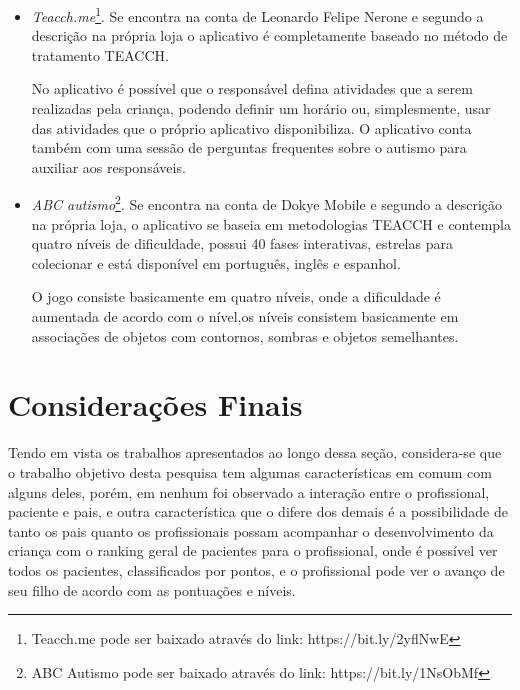 \begin{itemize}
	
	\item \textit{Teacch.me}\footnote{Teacch.me pode ser baixado através do link: https://bit.ly/2yflNwE}. Se encontra na conta de Leonardo Felipe Nerone e segundo a descrição na própria loja o aplicativo é completamente baseado no método de tratamento TEACCH.
	
	No aplicativo é possível que o responsável defina atividades que a serem realizadas pela criança, podendo definir um horário ou, simplesmente, usar das atividades que o próprio aplicativo disponibiliza. O aplicativo conta também com uma sessão de perguntas frequentes sobre o autismo para auxiliar aos responsáveis.
	
	\item \textit{ABC autismo}\footnote{ABC Autismo pode ser baixado através do link: https://bit.ly/1NsObMf}.  Se encontra na conta de Dokye Mobile e segundo a descrição na própria loja, o aplicativo se baseia em metodologias TEACCH e contempla quatro níveis de dificuldade, possui 40 fases interativas, estrelas para colecionar e está disponível em português, inglês e espanhol.
	
	O jogo consiste basicamente em quatro níveis, onde a dificuldade é aumentada de acordo com o nível,os níveis consistem basicamente em associações de objetos com contornos, sombras e objetos semelhantes.
\end{itemize}

\section{Considerações Finais}
Tendo em vista os trabalhos apresentados ao longo dessa seção, considera-se que o trabalho objetivo desta pesquisa tem algumas características em comum com alguns deles, porém, em nenhum foi observado a interação entre o profissional, paciente e pais, e outra característica que o difere dos demais é a possibilidade de tanto os pais quanto os profissionais possam acompanhar o desenvolvimento da criança com o ranking geral de pacientes para o profissional, onde é possível ver todos os pacientes, classificados por pontos, e o profissional pode ver o avanço de seu filho de acordo com as pontuações e níveis.